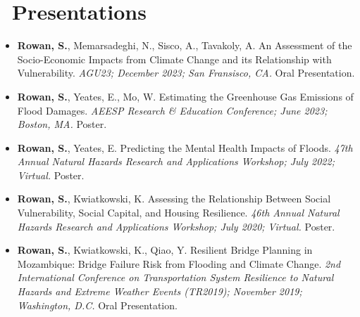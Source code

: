 \documentclass[11pt,a4paper,]{sr-awesome-cv}
\begin{document}
\normalsize

\hypertarget{presentations}{%
\section{\faUser~Presentations}\label{presentations}}

\footnotesize

\begin{itemize}
\item
  \textbf{Rowan, S.}, Memarsadeghi, N., Sisco, A., Tavakoly, A. An
  Assessment of the Socio-Economic Impacts from Climate Change and its
  Relationship with Vulnerability. \emph{AGU23; December 2023; San
  Fransisco, CA.} Oral Presentation.
\item
  \textbf{Rowan, S.}, Yeates, E., Mo, W. Estimating the Greenhouse Gas
  Emissions of Flood Damages. \emph{AEESP Research \& Education
  Conference; June 2023; Boston, MA.} Poster.
\item
  \textbf{Rowan, S.}, Yeates, E. Predicting the Mental Health Impacts of
  Floods. \emph{47th Annual Natural Hazards Research and Applications
  Workshop; July 2022; Virtual.} Poster.
\item
  \textbf{Rowan, S.}, Kwiatkowski, K. Assessing the Relationship Between
  Social Vulnerability, Social Capital, and Housing Resilience.
  \emph{46th Annual Natural Hazards Research and Applications Workshop;
  July 2020; Virtual.} Poster.
\item
  \textbf{Rowan, S.}, Kwiatkowski, K., Qiao, Y. Resilient Bridge
  Planning in Mozambique: Bridge Failure Risk from Flooding and Climate
  Change. \emph{2nd International Conference on Transportation System
  Resilience to Natural Hazards and Extreme Weather Events (TR2019);
  November 2019; Washington, D.C.} Oral Presentation.
\end{itemize}

\normalsize
\end{document}
